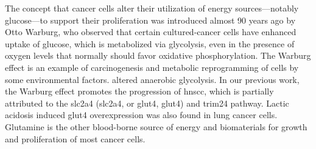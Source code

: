 \documentclass[12pt, a4paper]{article}
\begin{document}
\begin{outline}
\1 
\end{outline}

The concept that cancer cells alter their utilization of energy sources—notably glucose—to support their proliferation was introduced almost 90 years ago by Otto Warburg, who observed that certain cultured-cancer cells have enhanced uptake of glucose, which is metabolized via glycolysis, even in the presence of oxygen levels that normally should favor oxidative phosphorylation.
The Warburg effect\citep{Warburg1956} is an example of carcinogenesis and metabolic reprogramming of cells by some environmental factors.
altered anaerobic glycolysis. 
In our previous work\citep{Chang2017b}, the Warburg effect promotes the progression of \acrshort{hnscc}, which is partially attributed to the \acrlong{slc2a4} (\acrshort{slc2a4}, or \acrlong{glut4}, \acrshort{glut4}) and \acrfull{trim24} pathway\citep{Chang2017b}\citep{Mani2020}.
Lactic acidosis induced \acrshort{glut4} overexpression was also found in lung cancer cells\citep{Prado-Garcia2020}. 
Glutamine is the other blood-borne source of energy and biomaterials for growth and proliferation of most cancer cells\citep{Hanahan2017}.





\end{document}
